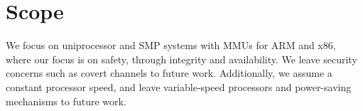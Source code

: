 \section{Scope}

We focus on uniprocessor and \gls{SMP} systems with \glspl{MMU} for ARM and x86, where our focus is on safety, through integrity and availability. We leave security concerns such as covert channels to future work. Additionally, we assume a constant processor speed, and leave variable-speed processors and power-saving mechanisms to future work.
